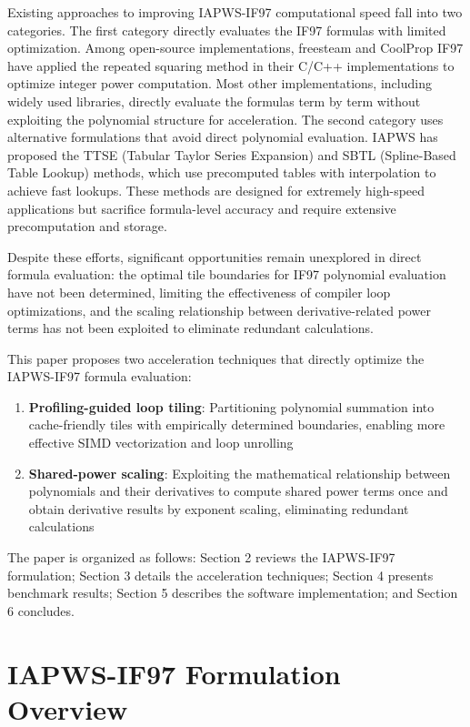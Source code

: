 \documentclass{article}
\begin{document}
Existing approaches to improving IAPWS-IF97 computational speed fall into two categories. The first category directly evaluates 
the IF97 formulas with limited optimization. 
Among open-source implementations, freesteam \cite{FreeSteam} and CoolProp IF97 \cite{CoolProp,CoolPropIF97} 
have applied the repeated squaring method in their C/C++ implementations to optimize integer power computation. 
Most other implementations, including widely used libraries, directly evaluate the formulas term by term 
without exploiting the polynomial structure for acceleration. 
The second category uses alternative formulations that avoid direct polynomial evaluation. IAPWS has proposed the TTSE (Tabular Taylor Series Expansion) \cite{TTSE} and SBTL (Spline-Based Table Lookup) \cite{SBTL} methods, which use precomputed tables with interpolation to achieve fast lookups. These methods are designed for extremely high-speed applications but sacrifice formula-level accuracy and require extensive precomputation and storage.

Despite these efforts, significant opportunities remain unexplored in direct formula evaluation: the optimal tile 
boundaries for IF97 polynomial evaluation have not been determined, limiting the effectiveness of compiler loop optimizations, 
and the scaling relationship between derivative-related power terms has not been exploited to eliminate redundant calculations.

This paper proposes two acceleration techniques that directly optimize the IAPWS-IF97 formula evaluation:
\begin{enumerate}
    \item \textbf{Profiling-guided loop tiling}: Partitioning polynomial summation into cache-friendly tiles with empirically determined boundaries, enabling more effective SIMD vectorization and loop unrolling
    \item \textbf{Shared-power scaling}: Exploiting the mathematical relationship between polynomials and their derivatives to compute shared power terms once and obtain derivative results by exponent scaling, eliminating redundant calculations
\end{enumerate}

The paper is organized as follows: Section 2 reviews the IAPWS-IF97 formulation; Section 3 details the acceleration techniques; Section 4 presents benchmark results; Section 5 describes the software implementation; and Section 6 concludes.

\section{IAPWS-IF97 Formulation Overview}
\end{document}
